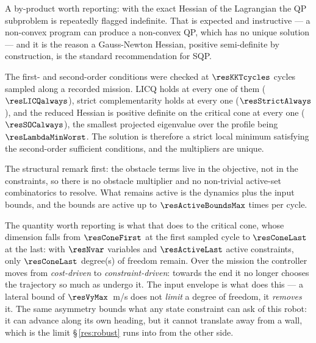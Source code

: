 A by-product worth reporting: with the exact Hessian of the Lagrangian the QP subproblem is repeatedly flagged indefinite. That is expected and instructive --- a non-convex program can produce a non-convex QP, which has no unique solution --- and it is the reason a Gauss-Newton Hessian, positive semi-definite by construction, is the standard recommendation for SQP.



\label{res:kkt}


The first- and second-order conditions were checked at $\resKKTcycles$ cycles sampled along a recorded mission. LICQ holds at every one of them ($\resLICQalways$), strict complementarity holds at every one ($\resStrictAlways$), and the reduced Hessian is positive definite on the critical cone at every one ($\resSOCalways$), the smallest projected eigenvalue over the profile being $\resLambdaMinWorst$. The solution is therefore a strict local minimum satisfying the second-order sufficient conditions, and the multipliers are unique.

The structural remark first: the obstacle terms live in the objective, not in the constraints, so there is no obstacle multiplier and no non-trivial active-set combinatorics to resolve. What remains active is the dynamics plus the input bounds, and the bounds are active up to $\resActiveBoundsMax$ times per cycle.

The quantity worth reporting is what that does to the critical cone, whose dimension falls from $\resConeFirst$ at the first sampled cycle to $\resConeLast$ at the last: with $\resNvar$ variables and $\resActiveLast$ active constraints, only $\resConeLast$ degree(s) of freedom remain. Over the mission the controller moves from \emph{cost-driven} to \emph{constraint-driven}: towards the end it no longer chooses the trajectory so much as undergo it. The input envelope is what does this --- a lateral bound of $\resVyMax$~m/s does not \emph{limit} a degree of freedom, it \emph{removes} it. The same asymmetry bounds what any state constraint can ask of this robot: it can advance along its own heading, but it cannot translate away from a wall, which is the limit \S\,\ref{res:robust} runs into from the other side.

